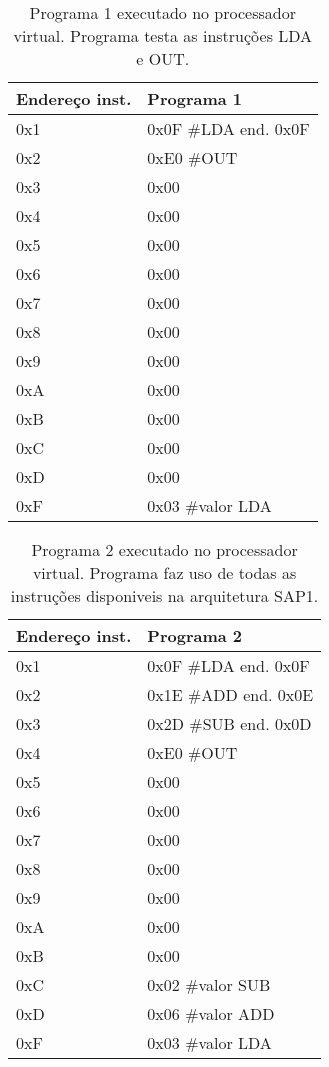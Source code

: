 \begin{table}
  \caption{Programa 1 executado no processador virtual. Programa testa as instruções LDA e OUT.}
\begin{tabular}{ll}
  \hline
 Endereço inst. & Programa 1 \\
 \hline
 0x1 & 0x0F \#LDA end. 0x0F \\
 0x2 & 0xE0 \#OUT \\
 0x3 & 0x00 \\
 0x4 & 0x00  \\
 0x5 & 0x00  \\
 0x6 & 0x00  \\
 0x7 & 0x00  \\
 0x8 & 0x00  \\
 0x9 & 0x00  \\
 0xA & 0x00  \\
 0xB & 0x00  \\
 0xC & 0x00  \\
 0xD & 0x00  \\
 0xF & 0x03 \#valor LDA \\
 \hline
\end{tabular}
\label{tab-p1}
\end{table}


\begin{table}
  \caption{Programa 2 executado no processador virtual. Programa faz uso de todas as instruções disponiveis na arquitetura SAP1.}
\begin{tabular}{ll}
  \hline
 Endereço inst. & Programa 2 \\
 \hline
 0x1 & 0x0F \#LDA end. 0x0F \\
 0x2 & 0x1E \#ADD end. 0x0E \\
 0x3 & 0x2D \#SUB end. 0x0D \\
 0x4 & 0xE0 \#OUT \\
 0x5 & 0x00 \\
 0x6 & 0x00 \\
 0x7 & 0x00 \\
 0x8 & 0x00 \\
 0x9 & 0x00 \\
 0xA & 0x00 \\
 0xB & 0x00 \\
 0xC & 0x02 \#valor SUB \\
 0xD & 0x06 \#valor ADD \\
 0xF & 0x03 \#valor LDA \\
 \hline
\end{tabular}
\label{tab-p2}
\end{table}
